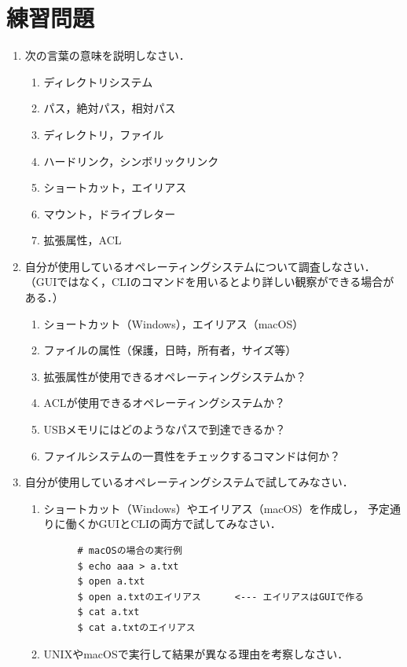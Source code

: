 \section*{練習問題}
\begin{enumerate}
  \renewcommand{\labelenumi}{\ttfamily\arabic{chapter}.\arabic{enumi}}
  \setlength{\leftskip}{1em}
\item 次の言葉の意味を説明しなさい．
  \begin{enumerate}
  \item ディレクトリシステム
  \item パス，絶対パス，相対パス
  \item ディレクトリ，ファイル
  \item ハードリンク，シンボリックリンク
  \item ショートカット，エイリアス
  \item マウント，ドライブレター
  \item 拡張属性，ACL
  \end{enumerate}
\item 自分が使用しているオペレーティングシステムについて調査しなさい．\\
  （GUIではなく，CLIのコマンドを用いるとより詳しい観察ができる場合がある．）
  \begin{enumerate}
  \item ショートカット（Windows），エイリアス（macOS）
  \item ファイルの属性（保護，日時，所有者，サイズ等）
  \item 拡張属性が使用できるオペレーティングシステムか？
  \item ACLが使用できるオペレーティングシステムか？
  \item USBメモリにはどのようなパスで到達できるか？
  \item ファイルシステムの一貫性をチェックするコマンドは何か？
  \end{enumerate}
\item 自分が使用しているオペレーティングシステムで試してみなさい．
  \begin{enumerate}
  \item ショートカット（Windows）やエイリアス（macOS）を作成し，
    予定通りに働くかGUIとCLIの両方で試してみなさい．
    \begin{lstlisting}
      # macOSの場合の実行例
      $ echo aaa > a.txt
      $ open a.txt
      $ open a.txtのエイリアス      <--- エイリアスはGUIで作る
      $ cat a.txt
      $ cat a.txtのエイリアス
    \end{lstlisting} %
  \item UNIXやmacOSで実行して結果が異なる理由を考察しなさい．

\end{enumerate}
\end{enumerate}
